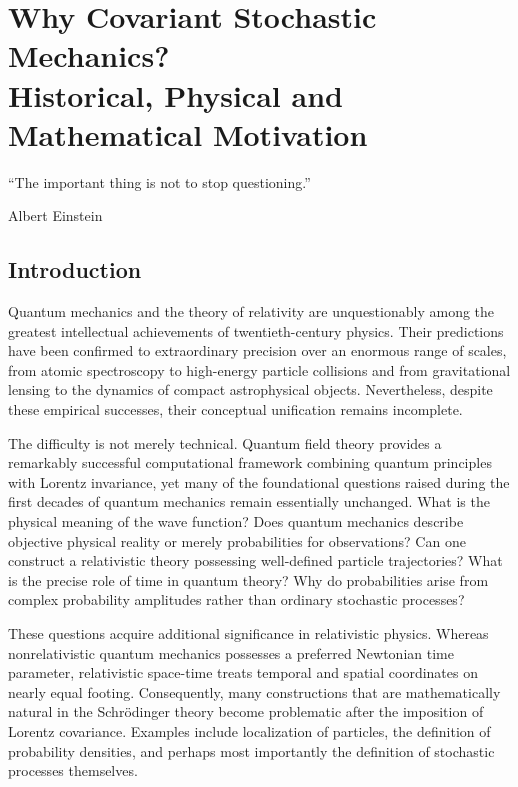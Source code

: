 
\chapter{Why Covariant Stochastic Mechanics?\\
Historical, Physical and Mathematical Motivation}

\epigraph{``The important thing is not to stop questioning.''}
{Albert Einstein}

\section{Introduction}

Quantum mechanics and the theory of relativity are unquestionably among the
greatest intellectual achievements of twentieth-century physics. Their
predictions have been confirmed to extraordinary precision over an enormous
range of scales, from atomic spectroscopy to high-energy particle collisions
and from gravitational lensing to the dynamics of compact astrophysical
objects. Nevertheless, despite these empirical successes, their conceptual
unification remains incomplete.

The difficulty is not merely technical. Quantum field theory provides a
remarkably successful computational framework combining quantum principles
with Lorentz invariance, yet many of the foundational questions raised during
the first decades of quantum mechanics remain essentially unchanged.
What is the physical meaning of the wave function? Does quantum mechanics
describe objective physical reality or merely probabilities for observations?
Can one construct a relativistic theory possessing well-defined particle
trajectories? What is the precise role of time in quantum theory? Why do
probabilities arise from complex probability amplitudes rather than ordinary
stochastic processes?

These questions acquire additional significance in relativistic physics.
Whereas nonrelativistic quantum mechanics possesses a preferred Newtonian
time parameter, relativistic space-time treats temporal and spatial
coordinates on nearly equal footing. Consequently, many constructions that are
mathematically natural in the Schrödinger theory become problematic after the
imposition of Lorentz covariance. Examples include localization of particles,
the definition of probability densities, and perhaps most importantly the
definition of stochastic processes themselves.

